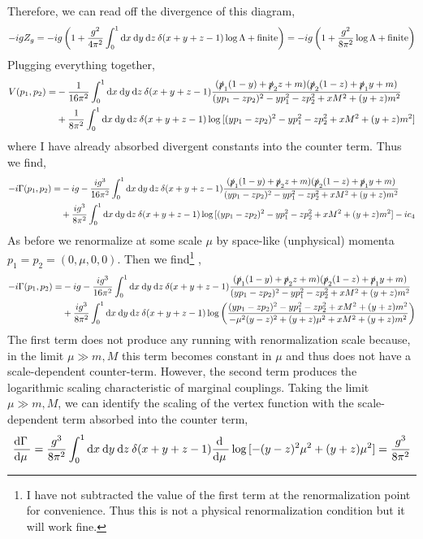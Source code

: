 \documentclass[12pt]{article}
\begin{document}
Therefore, we can read off the divergence of this diagram,
\[ - i g Z_g = -i g \left( 1 + \frac{g^2}{4 \pi^2} \int_0^1 \mathrm{d}x \: \mathrm{d}y \: \mathrm{d}z \: \delta(x + y + z - 1) \log{\Lambda} + \text{finite} \right) = -i g \left( 1 + \frac{g^2}{8 \pi^2} \log{\Lambda} + \text{finite} \right) \]
Plugging everything together,
\begin{align*}
V(p_1, p_2) = & - \frac{1}{16 \pi^2} \int_0^1 \mathrm{d}x \: \mathrm{d}y \: \mathrm{d}z \: \delta(x + y + z - 1) \frac{(\slashed{p}_1(1 - y) + \slashed{p}_2 z + m)(\slashed{p}_2(1 - z) + \slashed{p}_1 y + m)}{(y p_1 - z p_2)^2 - y p_1^2 - z p_2^2 + x M^2 + (y + z) m^2}
\\
& + \frac{1}{8 \pi^2} \int_0^1 \mathrm{d}x \: \mathrm{d}y \: \mathrm{d}z \: \delta(x + y + z - 1) \log{[(y p_1 - z p_2)^2 - y p_1^2 - z p_2^2 + x M^2 + (y + z) m^2]} 
\end{align*}
where I have already absorbed divergent constants into the counter term. Thus we find,
\begin{align*}
-i \Gamma(p_1, p_2) = & - ig - \frac{i g^3}{16 \pi^2} \int_0^1 \mathrm{d}x \: \mathrm{d}y \: \mathrm{d}z \: \delta(x + y + z - 1) \frac{(\slashed{p}_1(1 - y) + \slashed{p}_2 z + m)(\slashed{p}_2(1 - z) + \slashed{p}_1 y + m)}{(y p_1 - z p_2)^2 - y p_1^2 - z p_2^2 + x M^2 + (y + z) m^2}
\\
& + \frac{i g^3}{8 \pi^2} \int_0^1 \mathrm{d}x \: \mathrm{d}y \: \mathrm{d}z \: \delta(x + y + z - 1) \log{[(y p_1 - z p_2)^2 - y p_1^2 - z p_2^2 + x M^2 + (y + z) m^2]} -  i c_4
\end{align*}
As before we renormalize at some scale $\mu$ by space-like (unphysical) momenta $p_1 = p_2 = (0, \mu, 0, 0)$. Then we find\footnote{I have not subtracted the value of the first term at the renormalization point for convenience. Thus this is not a physical renormalization condition but it will work fine.} , 
\begin{align*}
-i \Gamma(p_1, p_2) = & - i g - \frac{i g^3}{16 \pi^2} \int_0^1 \mathrm{d}x \: \mathrm{d}y \: \mathrm{d}z \: \delta(x + y + z - 1) \frac{(\slashed{p}_1(1 - y) + \slashed{p}_2 z + m)(\slashed{p}_2(1 - z) + \slashed{p}_1 y + m)}{(y p_1 - z p_2)^2 - y p_1^2 - z p_2^2 + x M^2 + (y + z) m^2}
\\
& + \frac{i g^3}{8 \pi^2} \int_0^1 \mathrm{d}x \: \mathrm{d}y \: \mathrm{d}z \: \delta(x + y + z - 1) \log{\left(\frac{(y p_1 - z p_2)^2 - y p_1^2 - z p_2^2 + x M^2 + (y + z) m^2}{-\mu^2(y - z)^2 + (y + z) \mu^2 + x M^2 + (y + z) m^2}\right)}
\end{align*} 
The first term does not produce any running with renormalization scale because, in the limit $\mu \gg m, M$ this term becomes constant in $\mu$ and thus does not have a scale-dependent counter-term. However, the second term produces the logarithmic scaling characteristic of marginal couplings. Taking the limit $\mu \gg m, M$, we can identify the scaling of the vertex function with the scale-dependent term absorbed into the counter term,
\begin{align*}
\frac{\mathrm{d}\Gamma \:}{\mathrm{d}\mu \:} = \frac{g^3}{8\pi^2} \int_0^1 \mathrm{d}x \: \mathrm{d}y \: \mathrm{d}z \: \delta(x + y + z - 1) \frac{\mathrm{d} \:}{\mathrm{d}\mu \:} \log{[-(y - z)^2 \mu^2 + (y + z) \mu^2]} = \frac{g^3}{8 \pi^2} 
\end{align*}
\end{document}
